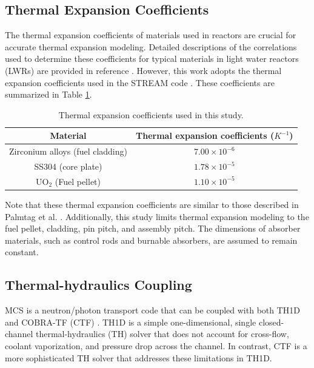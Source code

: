 \subsection{Thermal Expansion Coefficients} \label{sec32}

The thermal expansion coefficients of materials used in reactors are crucial for accurate thermal expansion modeling. Detailed descriptions of the correlations used to determine these coefficients for typical materials in light water reactors (LWRs) are provided in reference \cite{palmtag}. However, this work adopts the thermal expansion coefficients used in the STREAM code \cite{choi_2021}. These coefficients are summarized in Table \ref{tab1}.
\begin{table}
    \centering
    \caption{Thermal expansion coefficients used in this study.}
    \label{tab1} 
   \begin{adjustbox}{width=0.72\textwidth} %
    \begin{tabular}{| c | c | }
    \hline 
     Material & Thermal expansion coefficients ($K^{-1}$) \\
     \hline
     Zirconium alloys (fuel cladding)     & $7.00\times10^{-6}$      \\ \hline
     SS304 (core plate)                   & $1.78\times10^{-5}$      \\ \hline
     UO$_2$ (Fuel pellet)                 & $1.10\times10^{-5}$      \\ \hline
    \end{tabular}
    \end{adjustbox}
\end{table}

Note that these thermal expansion coefficients are similar to those described in Palmtag et al. \cite{palmtag}. Additionally, this study limits thermal expansion modeling to the fuel pellet, cladding, pin pitch, and assembly pitch. The dimensions of absorber materials, such as control rods and burnable absorbers, are assumed to remain constant.

\subsection{Thermal-hydraulics Coupling} \label{sec33a}

MCS is a neutron/photon transport code that can be coupled with both TH1D \cite{ryu_2015} and COBRA-TF (CTF) \cite{salko}. TH1D is a simple one-dimensional, single closed-channel thermal-hydraulics (TH) solver that does not account for cross-flow, coolant vaporization, and pressure drop across the channel. In contrast, CTF is a more sophisticated TH solver that addresses these limitations in TH1D.

